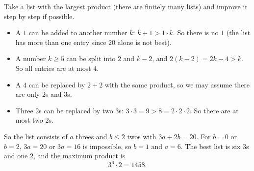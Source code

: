 Take a list with the largest product (there are finitely many lists) and improve it step by step if possible.
\begin{itemize}
\item A $1$ can be added to another number $k$: $k+1>1\cdot k$. So there is no $1$ (the list has more than one entry since $20$ alone is not best).
\item A number $k\ge5$ can be split into $2$ and $k-2$, and $2(k-2)=2k-4>k$. So all entries are at most $4$.
\item A $4$ can be replaced by $2+2$ with the same product, so we may assume there are only $2$s and $3$s.
\item Three $2$s can be replaced by two $3$s: $3\cdot3=9>8=2\cdot2\cdot2$. So there are at most two $2$s.
\end{itemize}
So the list consists of $a$ threes and $b\le2$ twos with $3a+2b=20$. For $b=0$ or $b=2$, $3a=20$ or $3a=16$ is impossible, so $b=1$ and $a=6$. The best list is six $3$s and one $2$, and the maximum product is
\[
3^6\cdot2=\boxed{1458}.
\]
